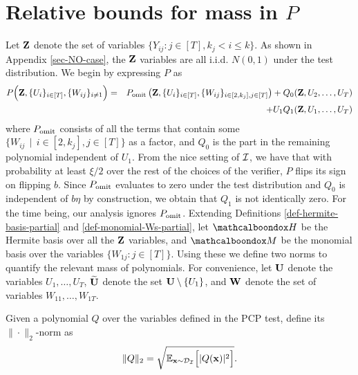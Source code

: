 \section{Relative bounds for mass in $P$}\label{sec:anticonc}

\newcommand{\Wu}{{\widetilde{\bf U}}}
Let $\mbf{Z}$ denote the set of variables $\{Y_{ij}: j \in [T], k_j < i\leq k\}$. 
As shown in Appendix \ref{sec-NO-case}, the $\mbf{Z}$ variables are all i.i.d. $N(0,1)$ under the test distribution. 
We begin by expressing $P$ as 
\begin{eqnarray}
P\Big({\bf Z},\{U_i\}_{i \in [T]},\{W_{ij}\}_{i \ne 1}\Big) & =  & P_{\rm omit}\left({\bf Z},\{U_i\}_{i \in [T]},\{W_{ij}\}_{i \in [2,k_j], j\in [T]}\right) + 
Q_0({\bf Z},U_2,\ldots,U_T) \nonumber \\
& & + U_1Q_1({\bf Z},U_1,\ldots,U_T) \label{eqn-split-P-PrelQ0Q1} 
\end{eqnarray}
where $P_{\rm omit}$ consists of all the terms that contain some $\{W_{ij}\,\mid\, i \in [2,k_j], j\in [T]\}$ as a factor, and $Q_0$ is the part in the remaining polynomial independent of $U_1$.
From the nice setting of $\mathcal{I}$, we have that with probability at least $\xi/2$ over the rest of the choices of the verifier, $P$ flips its sign on flipping $b$. Since $P_{\rm omit}$ evaluates to zero under the test distribution and $Q_0$ is independent of $b\eta$ by construction, we obtain that $Q_1$ is not identically zero. For the time being, our analysis ignores $P_{\rm omit}$.
Extending Definitions \ref{def-hermite-basis-partial} and \ref{def-monomial-Ws-partial}, let $\mcb{H}$ be the Hermite basis over all the ${\bf Z}$ variables, and $\mcb{M}$ be the monomial basis over the variables $\{W_{1j} : j \in [T]\}$. Using these we define two norms to quantify the relevant mass of polynomials.
For convenience, let ${\bf U}$ denote the variables $U_1,\ldots,U_T$, $\Wu$ denote the set ${\bf U} \setminus \{U_1\}$, and ${\bf W}$ denote the set of variables $W_{11},\ldots,W_{1T}$.
\begin{definition} 
	Given a polynomial $Q$ over the variables defined in the PCP test, define its $\|\cdot\|_2$-norm as 
	\begin{equation*}
	\|Q\|_2 = \sqrt{\E_{{\bf x} \sim \mc{D}_{\mc{I}}}\Big[|Q({\bf x})|^2\Big]}.
	\end{equation*}
\end{definition}

